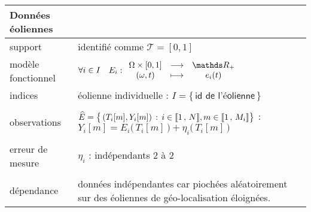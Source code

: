 \begin{tabularx}{\textwidth}{XX}
	\toprule
	\textbf{Données éoliennes}                                                                                                                                                                                         \\
	\midrule
	support            & identifié comme $\mathcal T = [0,1]$                                                                                                                                                          \\
	modèle fonctionnel & $\forall i \in I \quad E_i : \func {\Omega \times [0,1]} {\mathds R_+} {(\omega, t)} {e_i(t)}$                                                                                                \\
	indices            & éolienne individuelle : $I = \bigl\{ \, \textsf{id de l'éolienne} \,\bigr\}$                                                                                                                  \\
	\\
	observations       & $\widehat E = \bigl\{ \, (T_i[m], Y_i[m]) \, : \, i \in \llbracket 1 \, , \, N \rrbracket, m \in \llbracket 1 \, , \, M_i \rrbracket \bigr\}$ : $Y_i[m] = E_i\bigl( \, T_i[m] \, \bigr) + \eta_i\bigl( \, T_i[m] \, \bigr)$ \\
	\\
	erreur de mesure   & $\eta_i$ : indépendants 2 à 2                                                                                                                                                                 \\
	\\
	dépendance         & données indépendantes car piochées aléatoirement sur des éoliennes de géo-localisation éloignées.                                                                                             \\
	\bottomrule
\end{tabularx}
